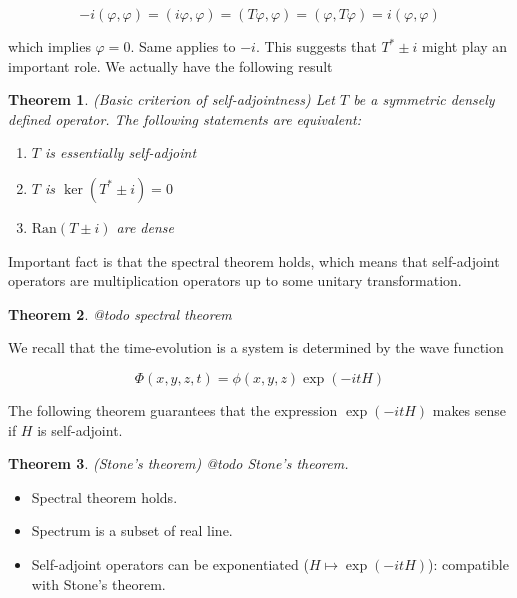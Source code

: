 \documentclass[11pt, a4paper, german]{article}
\theoremstyle{plain}
\newtheorem{theorem}{Theorem}
\theoremstyle{definition}
\theoremstyle{remark}
\numberwithin{equation}{section}
\numberwithin{theorem}{section}
\begin{document}
\begin{equation}
-i(\varphi, \varphi) = (i\varphi,\varphi) = (T\varphi,\varphi) = (\varphi, T\varphi) = i(\varphi,\varphi)
\end{equation}

which implies $\varphi = 0$. Same applies to $-i$. This suggests that $T^*\pm i$ might play an important role. We actually have the following result

\begin{theorem} (Basic criterion of self-adjointness) Let $T$ be a symmetric densely defined operator. The following statements are equivalent:

\begin{enumerate}
\item $T$ is essentially self-adjoint
\item $T$ is $\ker(T^*\pm i) = 0$
\item $\text{Ran}(T\pm i)$ are dense
\end{enumerate}

\end{theorem}

Important fact is that the spectral theorem holds, which means that self-adjoint operators are multiplication operators up to some unitary transformation.

\begin{theorem}
@todo spectral theorem
\end{theorem}

We recall that the time-evolution is a system is determined by the wave function 

\begin{equation}
\Phi(x,y,z,t) = \phi(x,y,z)\exp(-itH)
\end{equation}

The following theorem guarantees that the expression $\exp(-itH)$ makes sense if $H$ is self-adjoint.

\begin{theorem} (Stone's theorem)
@todo Stone's theorem.
\end{theorem}

\begin{itemize}
\item Spectral theorem holds.
\item Spectrum is a subset of real line.
\item Self-adjoint operators can be exponentiated ($H\mapsto \exp(-itH)$): compatible with Stone's theorem.
\end{itemize}
\end{document}
